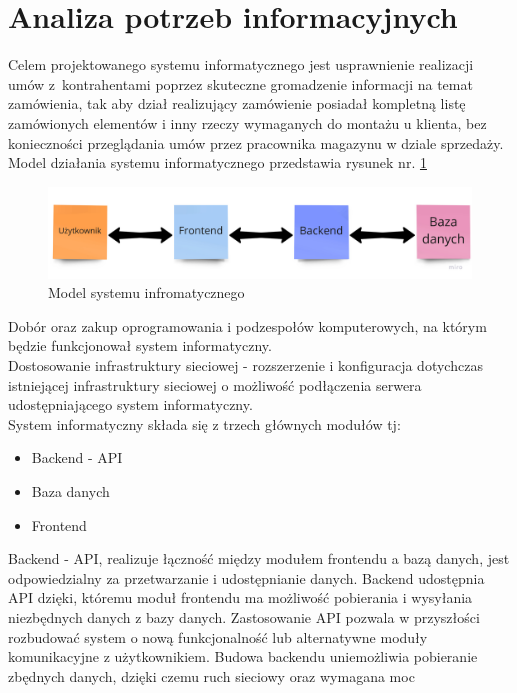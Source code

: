 \documentclass[12pt,a4paper]{article}
\begin{document}
	\section{Analiza potrzeb informacyjnych}
		\indent Celem projektowanego systemu informatycznego jest usprawnienie realizacji umów z~kontrahentami poprzez skuteczne gromadzenie informacji
			na temat zamówienia, tak aby dział realizujący zamówienie posiadał kompletną listę zamówionych elementów i inny rzeczy wymaganych do montażu u klienta, bez konieczności
			przeglądania umów przez pracownika magazynu w dziale sprzedaży. Model działania systemu informatycznego przedstawia rysunek nr. \ref{fig:sys_model}\\
			\begin{figure}[H]
			\centering
			\includegraphics[width=\textwidth]{img/model_systemu_informatycznego.jpg}
			\caption{Model systemu infromatycznego}
			\label{fig:sys_model}
		\end{figure}
		\indent Dobór oraz zakup oprogramowania i podzespołów komputerowych, na którym będzie funkcjonował system informatyczny. \\ 
		\indent Dostosowanie infrastruktury sieciowej - rozszerzenie i konfiguracja dotychczas istniejącej infrastruktury sieciowej o możliwość podłączenia serwera udostępniającego
			system informatyczny.\\		
		\indent System informatyczny składa się z trzech głównych modułów tj:
			\begin{itemize}
				\item Backend - API
				\item Baza danych
				\item Frontend
			\end{itemize}
		\indent Backend - API, realizuje łączność między modułem frontendu a bazą danych, jest odpowiedzialny za przetwarzanie i udostępnianie danych. Backend udostępnia API
			dzięki, któremu	moduł frontendu ma możliwość pobierania i wysyłania niezbędnych danych z bazy danych. Zastosowanie API pozwala w przyszłości rozbudować system o nową
			funkcjonalność lub alternatywne moduły komunikacyjne z użytkownikiem. Budowa backendu uniemożliwia pobieranie zbędnych danych, dzięki czemu ruch sieciowy oraz wymagana moc
\end{document}
